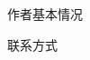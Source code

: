 
\begin{resume}

\begin{resumesection}{作者基本情况}
\end{resumesection}

\begin{resumelist}{联系方式}
\end{resumelist}

\end{resume}
